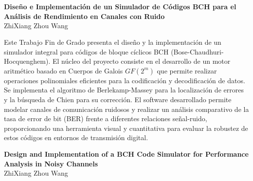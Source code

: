 
\chapter*{}
\thispagestyle{empty}

\begin{center}
    {\large\bfseries Diseño e Implementación de un Simulador de Códigos BCH para el Análisis de Rendimiento en Canales con Ruido}\\[0.5cm]
    ZhiXiang Zhou Wang
\end{center}

\vspace{0.7cm}

\vspace{0.7cm}

Este Trabajo Fin de Grado presenta el diseño y la implementación de un simulador integral para códigos de bloque cíclicos BCH (Bose-Chaudhuri-Hocquenghem). El núcleo del proyecto consiste en el desarrollo de un motor aritmético basado en Cuerpos de Galois $GF(2^m)$ que permite realizar operaciones polinomiales eficientes para la codificación y decodificación de datos. Se implementa el algoritmo de Berlekamp-Massey para la localización de errores y la búsqueda de Chien para su corrección. El software desarrollado permite modelar canales de comunicación ruidosos y realizar un análisis comparativo de la tasa de error de bit (BER) frente a diferentes relaciones señal-ruido, proporcionando una herramienta visual y cuantitativa para evaluar la robustez de estos códigos en entornos de transmisión digital.

\cleardoublepage

\thispagestyle{empty}
\begin{center}
    {\large\bfseries Design and Implementation of a BCH Code Simulator for Performance Analysis in Noisy Channels}\\[0.5cm]
    ZhiXiang Zhou Wang
\end{center}

\vspace{0.7cm}

\vspace{0.7cm}

